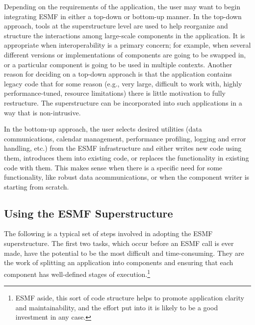 Depending on the requirements of the application, the user may 
want to begin integrating ESMF in either a top-down or bottom-up 
manner.  In the top-down approach, tools at the superstructure 
level are used to help reorganize and structure the interactions
among large-scale components in the application.  It is appropriate
when interoperability is a primary concern; for example, when 
several different versions or implementations of components are going 
to be swapped in, or a particular component is going to be used 
in multiple contexts.  Another reason for deciding on a top-down 
approach is that the application contains legacy code that for 
some reason (e.g., very large, difficult to work with, 
highly performance-tuned, resource limitations) there is little 
motivation to fully restructure.  The superstructure can be 
incorporated into such applications in a way that is non-intrusive.

In the bottom-up approach, the user selects desired utilities 
(data communications, calendar management, performance profiling,
logging and error handling, etc.) from the ESMF infrastructure 
and either writes new code using them, introduces them into 
existing code, or replaces the functionality in existing code 
with them.  This makes sense when there is a specific need for 
some functionality, like robust data acommunications, or 
when the component writer is starting from scratch.

\subsection{Using the ESMF Superstructure}

The following is a typical set of steps involved in adopting
the ESMF superstructure.  The first two tasks, which occur 
before an ESMF call is ever made, have the potential to be 
the most difficult and time-consuming.  They are the work 
of splitting an application into components and ensuring that
each component has well-defined stages of execution.\footnote{ESMF
aside, this sort of code structure helps to promote application
clarity and maintainability, and the effort put into it is likely
to be a good investment in any case.}

